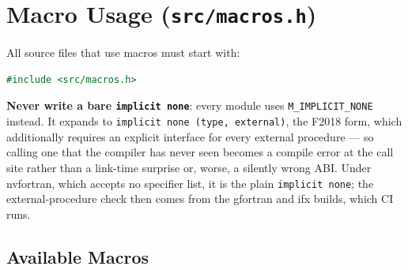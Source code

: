 \documentclass{article}
\begin{document}
\section{Macro Usage (\texttt{src/macros.h})}

All source files that use macros must start with:
\begin{lstlisting}[language=Fortran]
#include <src/macros.h>
\end{lstlisting}

\textbf{Never write a bare \texttt{implicit none}}: every module uses \texttt{M\_IMPLICIT\_NONE}
instead. It expands to \texttt{implicit none (type, external)}, the F2018 form, which additionally
requires an explicit interface for every external procedure — so calling one that the compiler has
never seen becomes a compile error at the call site rather than a link-time surprise or, worse, a
silently wrong ABI. Under nvfortran, which accepts no specifier list, it is the plain
\texttt{implicit none}; the external-procedure check then comes from the gfortran and ifx builds,
which CI runs.

\subsection{Available Macros}
\end{document}
